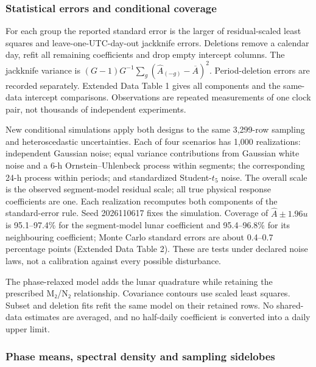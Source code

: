 \documentclass[
  10pt,
  a4paper,
]{article}
\begin{document}
\hypertarget{statistical-errors-and-conditional-coverage}{%
\subsubsection{Statistical errors and conditional
coverage}\label{statistical-errors-and-conditional-coverage}}

For each group the reported standard error is the larger of
residual-scaled least squares and leave-one-UTC-day-out jackknife
errors. Deletions remove a calendar day, refit all remaining
coefficients and drop empty intercept columns. The jackknife variance is
\((G-1)G^{-1}\sum_g(\hat A_{(-g)}-\overline A)^2\). Period-deletion
errors are recorded separately. Extended Data Table 1 gives all
components and the same-data intercept comparisons. Observations are
repeated measurements of one clock pair, not thousands of independent
experiments.

New conditional simulations apply both designs to the same 3,299-row
sampling and heteroscedastic uncertainties. Each of four scenarios has
1,000 realizations: independent Gaussian noise; equal variance
contributions from Gaussian white noise and a 6-h Ornstein--Uhlenbeck
process within segments; the corresponding 24-h process within periods;
and standardized Student-\(t_5\) noise. The overall scale is the
observed segment-model residual scale; all true physical response
coefficients are one. Each realization recomputes both components of the
standard-error rule. Seed 2026110617 fixes the simulation. Coverage of
\(\hat A\pm1.96u\) is 95.1--97.4\% for the segment-model lunar
coefficient and 95.4--96.8\% for its neighbouring coefficient; Monte
Carlo standard errors are about 0.4--0.7 percentage points (Extended
Data Table 2). These are tests under declared noise laws, not a
calibration against every possible disturbance.

The phase-relaxed model adds the lunar quadrature while retaining the
prescribed M₂/N₂ relationship. Covariance contours use scaled least
squares. Subset and deletion fits refit the same model on their retained
rows. No shared-data estimates are averaged, and no half-daily
coefficient is converted into a daily upper limit.

\hypertarget{phase-means-spectral-density-and-sampling-sidelobes}{%
\subsubsection{Phase means, spectral density and sampling
sidelobes}\label{phase-means-spectral-density-and-sampling-sidelobes}}
\end{document}
